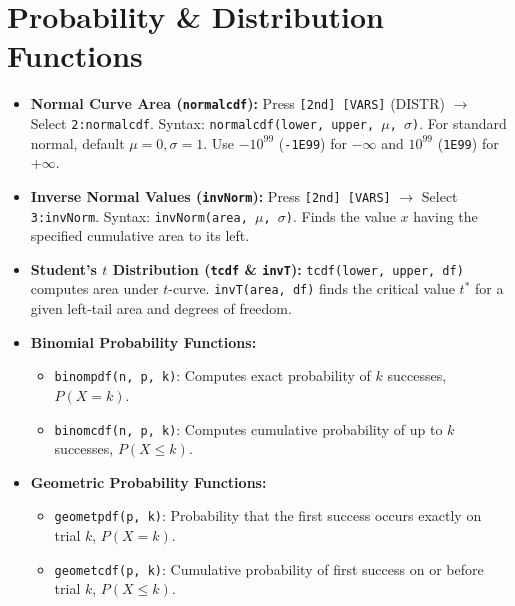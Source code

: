 \section{Probability \& Distribution Functions}
\begin{itemize}[leftmargin=1.5em]
  \item \textbf{Normal Curve Area (\texttt{normalcdf}):}
  Press \texttt{[2nd] [VARS]} (DISTR) $\to$ Select \texttt{2:normalcdf}. Syntax: \texttt{normalcdf(lower, upper, $\mu$, $\sigma$)}. For standard normal, default $\mu = 0, \sigma = 1$. Use $-10^{99}$ (\texttt{-1E99}) for $-\infty$ and $10^{99}$ (\texttt{1E99}) for $+\infty$.
  \item \textbf{Inverse Normal Values (\texttt{invNorm}):}
  Press \texttt{[2nd] [VARS]} $\to$ Select \texttt{3:invNorm}. Syntax: \texttt{invNorm(area, $\mu$, $\sigma$)}. Finds the value $x$ having the specified cumulative area to its left.
  \item \textbf{Student's $t$ Distribution (\texttt{tcdf} \& \texttt{invT}):}
  \texttt{tcdf(lower, upper, df)} computes area under $t$-curve. \texttt{invT(area, df)} finds the critical value $t^*$ for a given left-tail area and degrees of freedom.
  \item \textbf{Binomial Probability Functions:}
  \begin{itemize}
    \item \texttt{binompdf(n, p, k)}: Computes exact probability of $k$ successes, $P(X = k)$.
    \item \texttt{binomcdf(n, p, k)}: Computes cumulative probability of up to $k$ successes, $P(X \le k)$.
  \end{itemize}
  \item \textbf{Geometric Probability Functions:}
  \begin{itemize}
    \item \texttt{geometpdf(p, k)}: Probability that the first success occurs exactly on trial $k$, $P(X = k)$.
    \item \texttt{geometcdf(p, k)}: Cumulative probability of first success on or before trial $k$, $P(X \le k)$.
  \end{itemize}
\end{itemize}

